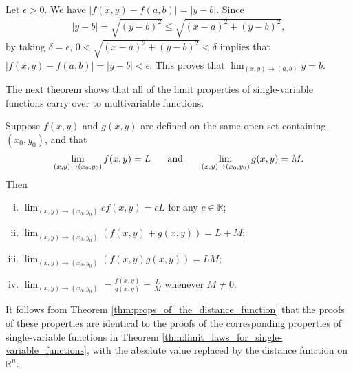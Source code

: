 \documentclass[12pt,letterpaper,reqno]{article}
\numberwithin{equation}{section}
\newcommand{\R}{\ensuremath{\mathbb R}}
\begin{document}
{{\color{red}
\begin{solution}
	Let $\epsilon>0$. We have $|f(x,y)-f(a,b)|=|y-b|$. Since 
		\begin{align*}
			|y-b|=\sqrt{(y-b)^2} \leq \sqrt{(x-a)^2+(y-b)^2},
		\end{align*}
		by taking $\delta=\epsilon$, $0<\sqrt{(x-a)^2+(y-b)^2}<\delta$ implies that $|f(x,y)-f(a,b)|=|y-b|<\epsilon$. This proves that $\lim_{(x,y) \to (a,b)} y = b$.
\end{solution}}

The next theorem shows that all of the limit properties of single-variable functions carry over to multivariable functions.

\begin{thm}\label{thm:limit_laws_for_multivariable_functions}
Suppose $f(x,y)$ and $g(x,y)$ are defined on the same open set containing $(x_0,y_0)$, and that 
\begin{align*}
	\lim_{(x,y) \to (x_0,y_0)}f(x,y)=L \hspace{0.5cm} \text{ and } \hspace{0.5cm} \lim_{(x,y) \to (x_0,y_0)}g(x,y)=M.
\end{align*}
Then
	\begin{enumerate}[(i)]
		\item $\lim_{(x,y) \to (x_0,y_0)} cf(x,y)=cL$ for any $c \in \R$;
		\item $\lim_{(x,y) \to (x_0,y_0)}(f(x,y)+ g(x,y))=L+M$;
		\item $\lim_{(x,y) \to (x_0,y_0)}(f(x,y)g(x,y))=LM$;
		\item $\lim_{(x,y) \to (x_0,y_0)}=\frac{f(x,y)}{g(x,y)}=\frac{L}{M}$ whenever $M \neq 0$.
	\end{enumerate}
\end{thm}

\begin{pf}
It follows from Theorem \ref{thm:props_of_the_distance_function} that the proofs of these properties are identical to the proofs of the corresponding properties of single-variable functions in Theorem \ref{thm:limit_laws_for_single-variable_functions}, with the absolute value replaced by the distance function on $\R^n$.
\end{pf}

}
\end{document}

